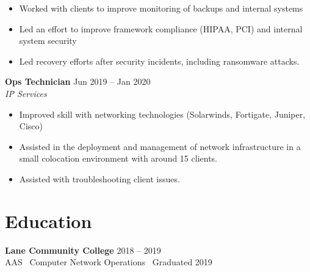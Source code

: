 \documentclass[11pt]{article}
\begin{document}
\begin{itemize}[leftmargin=*]
  
    \item Worked with clients to improve monitoring of backups and internal systems
  
    \item Led an effort to improve framework compliance (HIPAA, PCI) and internal system security
  
    \item Led recovery efforts after security incidents, including ransomware attacks.
  
\end{itemize}

\vspace{6pt}

\noindent\textbf{Ops Technician} \hfill \small{Jun 2019 -- Jan 2020}\\
\textit{IP Services}\\

\begin{itemize}[leftmargin=*]
  
    \item Improved skill with networking technologies (Solarwinds, Fortigate, Juniper, Cisco)
  
    \item Assisted in the deployment and management of network infrastructure in a small colocation environment with around 15 clients.
  
    \item Assisted with troubleshooting client issues.
  
\end{itemize}

\vspace{6pt}


\section*{Education}

\noindent\textbf{Lane Community College} \hfill \small{2018 -- 2019}\\
\small{AAS \textbullet\ Computer Network Operations \textbullet\ Graduated 2019} 
\vspace{6pt}
\end{document}
